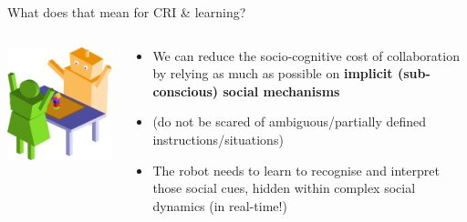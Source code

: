 \documentclass[compress]{beamer}
\begin{document}
\begin{frame}{What does that mean for CRI \& learning?}

    \begin{columns}
        \begin{column}{0.4\linewidth}
            
            \begin{center}
                \includegraphics[width=0.9\linewidth]{joint-action-scenario-completed}
            \end{center}
        \end{column}
        \begin{column}{0.6\linewidth}
             {
            \begin{itemize}
                \item<+-> We can reduce the socio-cognitive cost of
                    collaboration by relying as much
                    as possible on {\bf implicit (sub-conscious) social mechanisms}
                \item<+-> (do not be scared of ambiguous/partially defined
                    instructions/situations)
                \item<+-> The robot needs to learn to recognise and interpret
                    those social cues, hidden within complex social dynamics (in
                    real-time!)

\end{itemize}}
\end{column}
\end{columns}
\end{frame}
\end{document}

